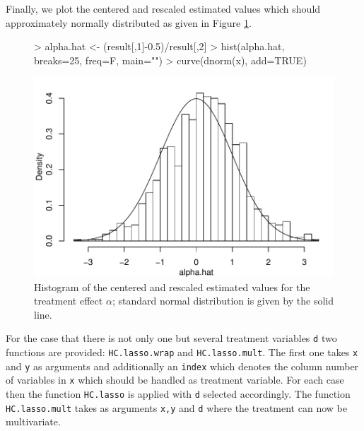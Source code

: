 \documentclass{amsart}
\begin{document}
Finally, we plot the centered and rescaled estimated values which should approximately normally distributed as given in Figure \ref{HC}.

\begin{figure}[h!]
\begin{center}
\label{HC}
\begin{Schunk}
\begin{Sinput}
> alpha.hat <- (result[,1]-0.5)/result[,2]
> hist(alpha.hat, breaks=25, freq=F, main="")
> curve(dnorm(x), add=TRUE)
\end{Sinput}
\end{Schunk}
\includegraphics{HDM-HC}
\end{center}
\caption{Histogram of the centered and rescaled estimated values for the treatment effect $\alpha$; standard normal distribution is given by the solid line.}
\end{figure}

For the case that there is not only one but several treatment variables \texttt{d} two functions are provided: \texttt{HC.lasso.wrap} and \texttt{HC.lasso.mult}. The first one takes \texttt{x} and \texttt{y} as arguments and additionally an \texttt{index} which denotes the column number of variables in \texttt{x} which should be handled as treatment variable. For each case then the function \texttt{HC.lasso} is applied with \texttt{d} selected accordingly. The function \texttt{HC.lasso.mult} takes as arguments \texttt{x,y} and \texttt{d} where the treatment can now be multivariate.
\end{document}
